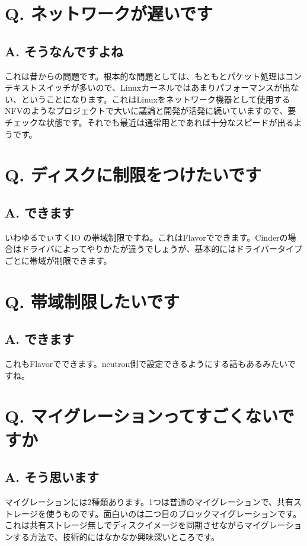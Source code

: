 \documentclass[9pt,b5paper,tombo,openany]{jsbook}
\begin{document}
\section*{Q. ネットワークが遅いです}
\subsection*{A. そうなんですよね}
これは昔からの問題です。根本的な問題としては、もともとパケット処理はコンテキストスイッチが多いので、Linuxカーネルではあまりパフォーマンスが出ない、ということになります。これはLinuxをネットワーク機器として使用するNFVのようなプロジェクトで大いに議論と開発が活発に続いていますので、要チェックな状態です。それでも最近は通常用とであれば十分なスピードが出るようです。

\section*{Q. ディスクに制限をつけたいです}
\subsection*{A. できます}
いわゆるでぃすくIO の帯域制限ですね。これはFlavorでできます。Cinderの場合はドライバによってやりかたが違うでしょうが、基本的にはドライバータイプごとに帯域が制限できます。

\section*{Q. 帯域制限したいです}
\subsection*{A. できます}
これもFlavorでできます。neutron側で設定できるようにする話もあるみたいですね。

\section*{Q. マイグレーションってすごくないですか}
\subsection*{A. そう思います}
マイグレーションには2種類あります。1つは普通のマイグレーションで、共有ストレージを使うものです。面白いのは二つ目のブロックマイグレーションです。これは共有ストレージ無しでディスクイメージを同期させながらマイグレーションする方法で、技術的にはなかなか興味深いところです。
\end{document}
